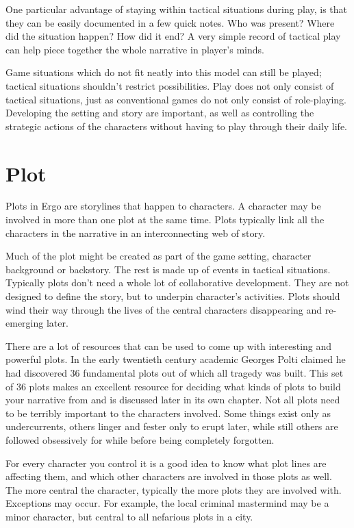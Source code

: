 \documentclass[twoside]{book}
\begin{document}
One particular advantage of staying within tactical situations during
play, is that they can be easily documented in a few quick notes. Who
was present? Where did the situation happen? How did it end? A very
simple record of tactical play can help piece together the whole
narrative in player's minds.

Game situations which do not fit neatly into this model can still be
played; tactical situations shouldn't restrict possibilities. Play
does not only consist of tactical situations, just as conventional
games do not only consist of role-playing. Developing the setting and
story are important, as well as controlling the strategic actions of
the characters without having to play through their daily life.

\section{Plot}

Plots in Ergo are storylines that happen to characters. A character
may be involved in more than one plot at the same time. Plots
typically link all the characters in the narrative in an
interconnecting web of story.

Much of the plot might be created as part of the game setting,
character background or backstory. The rest is made up of events in
tactical situations. Typically plots don't need a whole lot of
collaborative development. They are not designed to define the story,
but to underpin character's activities. Plots should wind their way
through the lives of the central characters disappearing and
re-emerging later.

There are a lot of resources that can be used to come up with
interesting and powerful plots. In the early twentieth century
academic Georges Polti claimed he had discovered 36 fundamental plots
out of which all tragedy was built. This set of 36 plots makes an
excellent resource for deciding what kinds of plots to build your
narrative from and is discussed later in its own chapter. Not all
plots need to be terribly important to the characters involved. Some
things exist only as undercurrents, others linger and fester only to
erupt later, while still others are followed obsessively for while
before being completely forgotten.

For every character you control it is a good idea to know what plot
lines are affecting them, and which other characters are involved in
those plots as well. The more central the character, typically the
more plots they are involved with. Exceptions may occur. For example,
the local criminal mastermind may be a minor character, but central to
all nefarious plots in a city.
\end{document}
